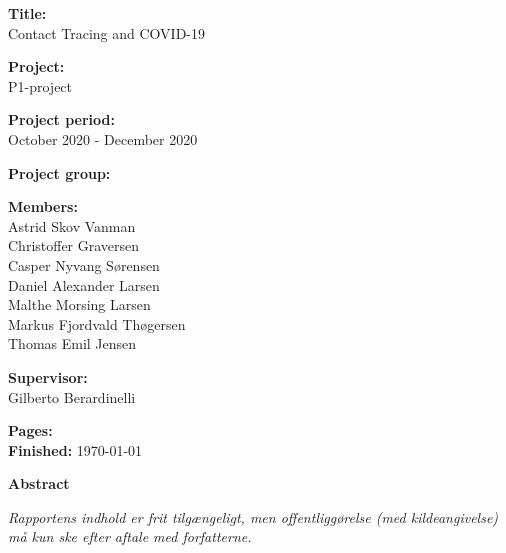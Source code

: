 \begin{minipage}[t]{0.48\textwidth}
    \textbf{Title:} \\[5pt]\bigskip\hspace{2ex}
    Contact Tracing and COVID-19
    
    \textbf{Project:} \\[5pt]\bigskip\hspace{2ex}
    P1-project
    
    \textbf{Project period:} \\[5pt]\bigskip\hspace{2ex}
    October 2020 - December 2020
    
    \textbf{Project group:} \\[5pt]\bigskip\hspace{2ex}
    \name %
    
    \textbf{Members:} \\[5pt]\hspace*{2ex}
    Astrid Skov Vanman  \\\hspace*{2ex}
    Christoffer Graversen \\\hspace*{2ex}
    Casper Nyvang Sørensen \\\hspace*{2ex}
    Daniel Alexander Larsen \\\hspace*{2ex}
    Malthe Morsing Larsen \\\hspace*{2ex}
    Markus Fjordvald Thøgersen \\\hspace*{2ex}
    Thomas Emil Jensen \\\hspace*{2ex}
    
    \textbf{Supervisor:} \\[5pt]\hspace*{2ex}
    Gilberto Berardinelli
    
    \vspace*{0.5cm}
    
    \textbf{Pages:} \pageref{litlist} \\
    \textbf{Finished:} \today
\end{minipage}
\hfill
\begin{minipage}[t]{0.483\textwidth}
    \textbf{Abstract} \\[5pt]
    \fbox{\parbox{7cm}{\bigskip\small{\bigskip}}}
\end{minipage}

\vfill

{\footnotesize\itshape Rapportens indhold er frit tilgængeligt, men offentliggørelse (med kildeangivelse) må kun ske efter aftale med forfatterne.}

